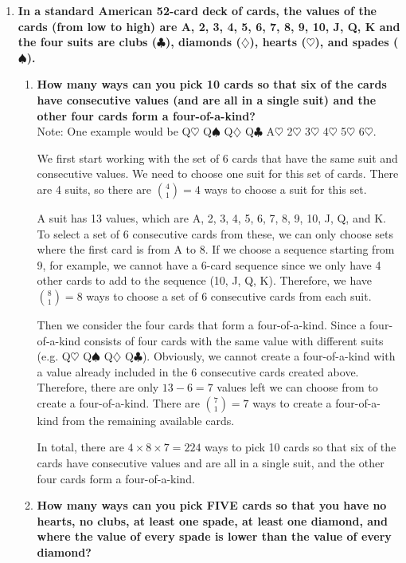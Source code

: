 \documentclass[10pt]{article}
\newcommand{\hs}{\heartsuit}
\newcommand{\sps}{\spadesuit}
\newcommand{\cs}{\clubsuit}
\newcommand{\ds}{\diamondsuit}
\begin{document}
\begin{enumerate}


\item
\textbf{In a standard American 52-card deck of cards, the values of the cards (from low to high) are A, 2, 3, 4, 5, 6, 7, 8, 9, 10, J, Q, K and the four suits are clubs ($\cs$), diamonds ($\ds$), hearts ($\hs$), and spades ($\sps$).}
\begin{enumerate}
\item
\textbf{How many ways can you pick 10 cards so that six of the cards have consecutive values (and are all in a single suit) and the other four cards form a four-of-a-kind?}\\
{\footnotesize Note: One example would be Q$\hs$ Q$\sps$ Q$\ds$ Q$\cs$  A$\hs$ 2$\hs$  3$\hs$  4$\hs$  5$\hs$  6$\hs$.}

We first start working with the set of 6 cards that have the same suit and consecutive values. We need to choose one suit for this set of cards. There are 4 suits, so there are $\binom{4}{1} = 4$ ways to choose a suit for this set. 

A suit has 13 values, which are A, 2, 3, 4, 5, 6, 7, 8, 9, 10, J, Q, and K. To select a set of 6 consecutive cards from these, we can only choose sets where the first card is from A to 8. If we choose a sequence starting from 9, for example, we cannot have a 6-card sequence since we only have 4 other cards to add to the sequence (10, J, Q, K). Therefore, we have $\binom{8}{1} = 8$ ways to choose a set of 6 consecutive cards from each suit.

Then we consider the four cards that form a four-of-a-kind. Since a four-of-a-kind consists of four cards with the same value with different suits (e.g. Q$\hs$ Q$\sps$ Q$\ds$ Q$\cs$). Obviously, we cannot create a four-of-a-kind with a value already included in the $6$ consecutive cards created above. Therefore, there are only $13 - 6 = 7$ values left we can choose from to create a four-of-a-kind. There are $\binom{7}{1}=7$ ways to create a four-of-a-kind from the remaining available cards.

In total, there are $4 \times 8 \times 7 = 224$ ways to pick 10 cards so that six of the cards have consecutive values and are all in a single suit, and the other four cards form a four-of-a-kind.

\item
\textbf{How many ways can you pick FIVE cards so that you have no hearts, no clubs, at least one spade, at least one diamond, and where the value of every spade is lower than the value of every diamond?}


\end{enumerate}
\end{enumerate}
\end{document}
